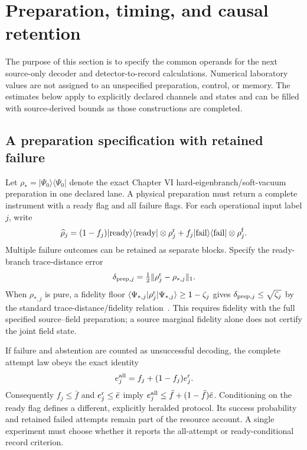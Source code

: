 \section{Preparation, timing, and causal retention}
\label{sec:foundation-budget}

The purpose of this section is to specify the common operands for the next
source-only decoder and detector-to-record calculations. Numerical laboratory
values are not assigned to an unspecified preparation, control, or memory.
The estimates below apply to explicitly declared channels and states and can
be filled with source-derived bounds as those constructions are completed.

\subsection{A preparation specification with retained failure}
Let $\rho_*=|\Psi_0\rangle\langle\Psi_0|$ denote the exact Chapter VI
hard-eigenbranch/soft-vacuum preparation in one declared lane. A physical
preparation must return a complete instrument with a ready flag and all
failure flags. For each operational input label $j$, write
\begin{equation}
 \widehat\rho_j=(1-f_j)|{\rm ready}\rangle\langle{\rm ready}|\otimes\rho_j^{\rm r}
       +f_j|{\rm fail}\rangle\langle{\rm fail}|\otimes\rho_j^{\rm f}.
 \label{eq:foundation-ready-state}
\end{equation}
Multiple failure outcomes can be retained as separate blocks. Specify the
ready-branch trace-distance error
\begin{equation}
 \delta_{{\rm prep},j}=\tfrac12\|\rho_j^{\rm r}-\rho_{*,j}\|_1.
\end{equation}
When $\rho_{*,j}$ is pure, a fidelity floor
$\langle\Psi_{*,j}|\rho_j^{\rm r}|\Psi_{*,j}\rangle\ge1-\zeta_j$
gives $\delta_{{\rm prep},j}\le\sqrt{\zeta_j}$ by the standard
trace-distance/fidelity relation~\cite{Watrous}.
This requires fidelity with the full specified source--field preparation;
a source marginal fidelity alone does not certify the joint field state.

If failure and abstention are counted as unsuccessful decoding, the complete
attempt law obeys the exact identity
\begin{equation}
 e_j^{\rm all}=f_j+(1-f_j)e_j^{\rm r}.
 \label{eq:foundation-failure-error}
\end{equation}
Consequently $f_j\le\bar f$ and $e_j^{\rm r}\le\bar e$ imply
$e_j^{\rm all}\le\bar f+(1-\bar f)\bar e$.
Conditioning on the ready flag defines a different, explicitly heralded
protocol. Its success probability and retained failed attempts remain part
of the resource account. A single experiment must choose whether it reports
the all-attempt or ready-conditional record criterion.

